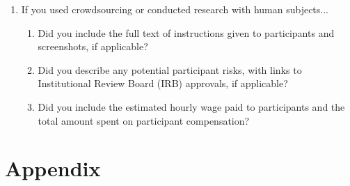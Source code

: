 \documentclass{article}
\begin{document}
\begin{enumerate}
\begin{enumerate}
\end{enumerate}

\item If you used crowdsourcing or conducted research with human subjects...
\begin{enumerate}
  \item Did you include the full text of instructions given to participants and screenshots, if applicable?
    \answerNA{}
  \item Did you describe any potential participant risks, with links to Institutional Review Board (IRB) approvals, if applicable?
    \answerNA{}
  \item Did you include the estimated hourly wage paid to participants and the total amount spent on participant compensation?
    \answerNA{}
\end{enumerate}

\end{enumerate}


\clearpage
\appendix

\section{Appendix}\label{appendix}
\end{document}
